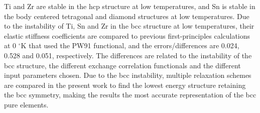 Ti and Zr are stable in the hcp structure at low temperatures, and Sn is stable in the body centered tetragonal and diamond structures at low temperatures. Due to the instability of Ti, Sn and Zr in the bcc structure at low temperatures, their elastic stiffness coefficients are compared to previous first-principles calculations at 0 $^\circ$K \cite{Shang2010b} that used the PW91 functional, and the errors/differences are 0.024, 0.528 and 0.051, respectively. The differences are related to the instability of the bcc structure, the different exchange correlation functionals and the different input parameters chosen. Due to the bcc instability, multiple relaxation schemes are compared in the present work to find the lowest energy structure retaining the bcc symmetry, making the results the most accurate representation of the bcc pure elements.  

